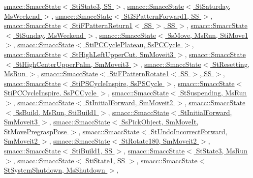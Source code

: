 \hyperlink{classsmacc_1_1SmaccState_afc39f8e0ca4001b2159a100da2fccd0e}{smacc\+::\+Smacc\+State$<$ Sti\+State3, S\+S $>$}, \hyperlink{classsmacc_1_1SmaccState_afc39f8e0ca4001b2159a100da2fccd0e}{smacc\+::\+Smacc\+State$<$ St\+Saturday, Ms\+Weekend $>$}, \hyperlink{classsmacc_1_1SmaccState_afc39f8e0ca4001b2159a100da2fccd0e}{smacc\+::\+Smacc\+State$<$ Sti\+S\+Pattern\+Forward1, S\+S $>$}, \hyperlink{classsmacc_1_1SmaccState_afc39f8e0ca4001b2159a100da2fccd0e}{smacc\+::\+Smacc\+State$<$ Sti\+F\+Pattern\+Return1$<$ S\+S $>$, S\+S $>$}, \hyperlink{classsmacc_1_1SmaccState_afc39f8e0ca4001b2159a100da2fccd0e}{smacc\+::\+Smacc\+State$<$ St\+Sunday, Ms\+Weekend $>$}, \hyperlink{classsmacc_1_1SmaccState_afc39f8e0ca4001b2159a100da2fccd0e}{smacc\+::\+Smacc\+State$<$ Ss\+Move, Ms\+Run, Sti\+Move1 $>$}, \hyperlink{classsmacc_1_1SmaccState_afc39f8e0ca4001b2159a100da2fccd0e}{smacc\+::\+Smacc\+State$<$ Sti\+P\+C\+Cycle\+Plateau, Ss\+P\+C\+Cycle $>$}, \hyperlink{classsmacc_1_1SmaccState_afc39f8e0ca4001b2159a100da2fccd0e}{smacc\+::\+Smacc\+State$<$ St\+High\+Left\+Upper\+Cut, Sm\+Moveit3 $>$}, \hyperlink{classsmacc_1_1SmaccState_afc39f8e0ca4001b2159a100da2fccd0e}{smacc\+::\+Smacc\+State$<$ St\+High\+Center\+Upper\+Palm, Sm\+Moveit3 $>$}, \hyperlink{classsmacc_1_1SmaccState_afc39f8e0ca4001b2159a100da2fccd0e}{smacc\+::\+Smacc\+State$<$ St\+Resetting, Ms\+Run $>$}, \hyperlink{classsmacc_1_1SmaccState_afc39f8e0ca4001b2159a100da2fccd0e}{smacc\+::\+Smacc\+State$<$ Sti\+F\+Pattern\+Rotate1$<$ S\+S $>$, S\+S $>$}, \hyperlink{classsmacc_1_1SmaccState_afc39f8e0ca4001b2159a100da2fccd0e}{smacc\+::\+Smacc\+State$<$ Sti\+P\+S\+Cycle\+Inspire, Ss\+P\+S\+Cycle $>$}, \hyperlink{classsmacc_1_1SmaccState_afc39f8e0ca4001b2159a100da2fccd0e}{smacc\+::\+Smacc\+State$<$ Sti\+P\+C\+Cycle\+Inspire, Ss\+P\+C\+Cycle $>$}, \hyperlink{classsmacc_1_1SmaccState_afc39f8e0ca4001b2159a100da2fccd0e}{smacc\+::\+Smacc\+State$<$ St\+Suspending, Ms\+Run $>$}, \hyperlink{classsmacc_1_1SmaccState_afc39f8e0ca4001b2159a100da2fccd0e}{smacc\+::\+Smacc\+State$<$ St\+Initial\+Forward, Sm\+Moveit2 $>$}, \hyperlink{classsmacc_1_1SmaccState_afc39f8e0ca4001b2159a100da2fccd0e}{smacc\+::\+Smacc\+State$<$ Ss\+Build, Ms\+Run, Sti\+Build1 $>$}, \hyperlink{classsmacc_1_1SmaccState_afc39f8e0ca4001b2159a100da2fccd0e}{smacc\+::\+Smacc\+State$<$ St\+Initial\+Forward, Sm\+Moveit3 $>$}, \hyperlink{classsmacc_1_1SmaccState_afc39f8e0ca4001b2159a100da2fccd0e}{smacc\+::\+Smacc\+State$<$ Ss\+Pick\+Object, Sm\+Move\+It, St\+Move\+Pregrasp\+Pose $>$}, \hyperlink{classsmacc_1_1SmaccState_afc39f8e0ca4001b2159a100da2fccd0e}{smacc\+::\+Smacc\+State$<$ St\+Undo\+Incorrect\+Forward, Sm\+Moveit2 $>$}, \hyperlink{classsmacc_1_1SmaccState_afc39f8e0ca4001b2159a100da2fccd0e}{smacc\+::\+Smacc\+State$<$ St\+Rotate180, Sm\+Moveit2 $>$}, \hyperlink{classsmacc_1_1SmaccState_afc39f8e0ca4001b2159a100da2fccd0e}{smacc\+::\+Smacc\+State$<$ Sti\+Build1, S\+S $>$}, \hyperlink{classsmacc_1_1SmaccState_afc39f8e0ca4001b2159a100da2fccd0e}{smacc\+::\+Smacc\+State$<$ St\+State3, Ms\+Run $>$}, \hyperlink{classsmacc_1_1SmaccState_afc39f8e0ca4001b2159a100da2fccd0e}{smacc\+::\+Smacc\+State$<$ Sti\+State1, S\+S $>$}, \hyperlink{classsmacc_1_1SmaccState_afc39f8e0ca4001b2159a100da2fccd0e}{smacc\+::\+Smacc\+State$<$ St\+System\+Shutdown, Ms\+Shutdown $>$}, 